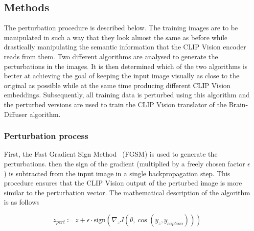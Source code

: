 \subsection{Methods}

The perturbation procedure is described below. The training images are to be manipulated in such a way that they look almost the same as before while drastically manipulating the semantic information that the CLIP Vision encoder reads from them. Two different algorithms are analysed to generate the perturbations in the images. It is then determined which of the two algorithms is better at achieving the goal of keeping the input image visually as close to the original as possible while at the same time producing different CLIP Vision embeddings. Subsequently, all training data is perturbed using this algorithm and the perturbed versions are used to train the CLIP Vision translator of the Brain-Diffuser algorithm.

\subsubsection{Perturbation process}

First, the Fast Gradient Sign Method~\cite{goodfellowExplainingHarnessingAdversarial2014} (FGSM) is used to generate the perturbations.  then the sign of the gradient (multiplied by a freely chosen factor $\epsilon$) is subtracted from the input image in a single backpropagation step. This procedure ensures that the CLIP Vision output of the perturbed image is more similar to the perturbation vector. The mathematical description of the algorithm is as follows

\[
z_{pert} \coloneq z + \epsilon \cdot \text{sign}(\nabla_z J(\theta, \cos(y_{z},y_{caption})))
\]

\noindent{}

